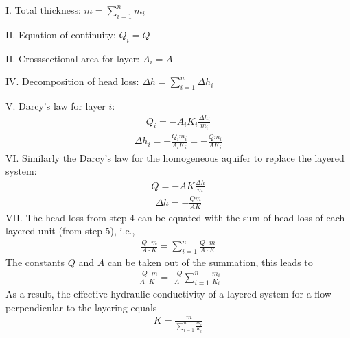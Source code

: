 \documentclass[letterpaper,10pt,english]{sphinxmanual}
\begin{document}
I. Total thickness: \(m = \sum\limits_{i=1}^n m_i \)

II.   Equation of continuity: \(Q_i = Q\)

II.  Cross\sphinxhyphen{}sectional area for layer: \(A_i = A \)

IV. Decomposition of head loss: \(\Delta h = \sum\limits_{i=1}^n \Delta h_i \)

V. Darcy’s law for layer \(i\):
\begin{equation*}
\begin{split}Q_i = - A_i K_i \frac{\Delta h_i}{m_i}\end{split}
\end{equation*}\begin{equation*}
\begin{split}\Delta h_i = -\frac{Q_i m_i}{A_i K_i} = - \frac{Q m_i}{A K_i}\end{split}
\end{equation*}
VI. Similarly the Darcy’s law for the homogeneous aquifer to replace the layered system:
\begin{equation*}
\begin{split}Q = - A K \frac{\Delta h}{m}\end{split}
\end{equation*}\begin{equation*}
\begin{split}\Delta h = - \frac{Q m}{A K }\end{split}
\end{equation*}
VII. The head loss from step 4 can be equated with the sum of head loss of each layered unit (from step 5), i.e.,
\begin{equation*}
\begin{split}
\frac{Q\cdot m}{A\cdot K}
=\sum\limits_{i=1}^n\frac{Q\cdot m}{A\cdot K}
\end{split}
\end{equation*}
The constants \(Q\) and \(A\) can be taken out of the summation, this leads to
\begin{equation*}
\begin{split}
\frac{ {-Q}\cdot m}{ A\cdot K}
=\frac{ {-Q}}{A}\sum\limits_{i=1}^n\frac{m_i}{K_i}
\end{split}
\end{equation*}
As a result, the effective hydraulic conductivity of a layered system for a flow perpendicular to the layering equals
\begin{equation*}
\begin{split}
K = \frac{m}{\sum\limits_{i=1}^n\frac{m_i}{K_i}}
\end{split}
\end{equation*}
\end{document}
